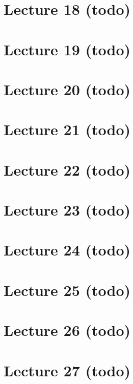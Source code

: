\hypertarget{lecture-18-todo}{%
\section{Lecture 18 (todo)}\label{lecture-18-todo}}

\hypertarget{lecture-19-todo}{%
\section{Lecture 19 (todo)}\label{lecture-19-todo}}

\hypertarget{lecture-20-todo}{%
\section{Lecture 20 (todo)}\label{lecture-20-todo}}

\hypertarget{lecture-21-todo}{%
\section{Lecture 21 (todo)}\label{lecture-21-todo}}

\hypertarget{lecture-22-todo}{%
\section{Lecture 22 (todo)}\label{lecture-22-todo}}

\hypertarget{lecture-23-todo}{%
\section{Lecture 23 (todo)}\label{lecture-23-todo}}

\hypertarget{lecture-24-todo}{%
\section{Lecture 24 (todo)}\label{lecture-24-todo}}

\hypertarget{lecture-25-todo}{%
\section{Lecture 25 (todo)}\label{lecture-25-todo}}

\hypertarget{lecture-26-todo}{%
\section{Lecture 26 (todo)}\label{lecture-26-todo}}

\hypertarget{lecture-27-todo}{%
\section{Lecture 27 (todo)}\label{lecture-27-todo}}

